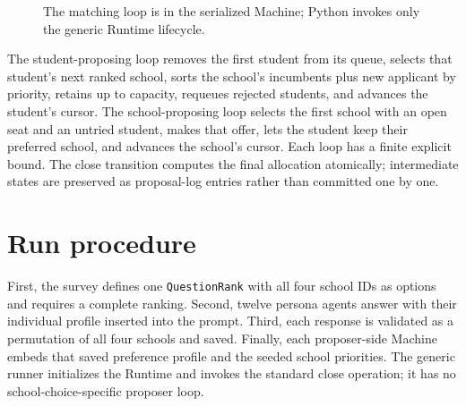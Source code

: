 \documentclass[11pt]{article}
\begin{document}
\begin{figure}[h]
\centering
{}
\caption{The matching loop is in the serialized Machine; Python invokes only the generic Runtime lifecycle.}
\end{figure}

The student-proposing loop removes the first student from its queue, selects that student's next ranked school, sorts the school's incumbents plus new applicant by priority, retains up to capacity, requeues rejected students, and advances the student's cursor. The school-proposing loop selects the first school with an open seat and an untried student, makes that offer, lets the student keep their preferred school, and advances the school's cursor. Each loop has a finite explicit bound. The close transition computes the final allocation atomically; intermediate states are preserved as proposal-log entries rather than committed one by one.

\section{Run procedure}
First, the survey defines one \texttt{QuestionRank} with all four school IDs as options and requires a complete ranking. Second, twelve persona agents answer with their individual profile inserted into the prompt. Third, each response is validated as a permutation of all four schools and saved. Finally, each proposer-side Machine embeds that saved preference profile and the seeded school priorities. The generic runner initializes the Runtime and invokes the standard close operation; it has no school-choice-specific proposer loop.
\end{document}

